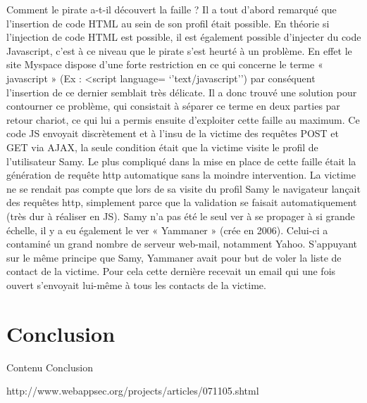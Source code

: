 \documentclass[a4paper,12pt]{report}
\begin{document}
Comment le pirate a-t-il découvert la faille ?
Il a tout d’abord remarqué que l’insertion de code HTML au sein de son profil était possible. En théorie si l’injection de code HTML est possible, il est également possible d’injecter du code Javascript, c’est à ce niveau que le pirate s’est heurté à un problème. En effet le site Myspace dispose d’une forte restriction en ce qui concerne le terme « javascript » (Ex : <script language= ‘’text/javascript’’) par conséquent l’insertion de ce dernier semblait très délicate. Il a donc trouvé une solution pour contourner ce problème, qui consistait à séparer ce terme en deux parties par retour chariot, ce qui lui a permis ensuite d’exploiter cette faille au maximum.
Ce code JS envoyait discrètement et à l’insu de la victime des requêtes POST et GET via AJAX, la seule condition était que la victime visite le profil de l’utilisateur Samy. Le plus compliqué dans la mise en place de cette faille était la génération de requête http automatique sans la moindre intervention. La victime ne se rendait pas compte que lors de sa visite du profil Samy le navigateur lançait des requêtes http, simplement parce que la validation se faisait automatiquement (très dur à réaliser en JS).
Samy n’a pas été le seul ver à se propager à si grande échelle, il y a eu également le ver « Yammaner » (crée en 2006). Celui-ci a contaminé un grand nombre de serveur web-mail, notamment Yahoo. S’appuyant sur le même principe que Samy, Yammaner avait pour but de voler la liste de contact de la victime. Pour cela cette dernière recevait un email qui une fois ouvert s’envoyait lui-même à tous les contacts de la victime.


    \newpage

  \chapter*{Conclusion} %
    Contenu Conclusion

    \newpage

  \renewcommand\glossaryname{Glossaire}
  \printglossaries
  \newpage

  \nocite{*}

  http://www.webappsec.org/projects/articles/071105.shtml
\end{document}
